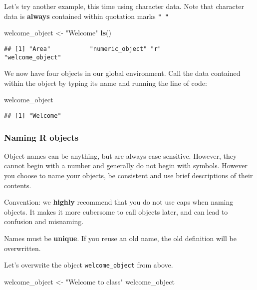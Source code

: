 \documentclass[]{article}
\newenvironment{Shaded}{\begin{snugshade}}{\end{snugshade}}
\newcommand{\KeywordTok}[1]{\textcolor[rgb]{0.13,0.29,0.53}{\textbf{#1}}}
\newcommand{\StringTok}[1]{\textcolor[rgb]{0.31,0.60,0.02}{#1}}
\newcommand{\NormalTok}[1]{#1}
\begin{document}
Let's try another example, this time using character data. Note that
character data is \textbf{always} contained within quotation marks
\texttt{"\ "}

\begin{Shaded}
\begin{Highlighting}[]
\NormalTok{welcome_object <-}\StringTok{ "Welcome"}
\KeywordTok{ls}\NormalTok{()}
\end{Highlighting}
\end{Shaded}

\begin{verbatim}
## [1] "Area"           "numeric_object" "r"              "welcome_object"
\end{verbatim}

We now have four objects in our global environment. Call the data
contained within the object by typing its name and running the line of
code:

\begin{Shaded}
\begin{Highlighting}[]
\NormalTok{welcome_object}
\end{Highlighting}
\end{Shaded}

\begin{verbatim}
## [1] "Welcome"
\end{verbatim}

\subsubsection{Naming R objects}\label{naming-r-objects}

Object names can be anything, but are always case sensitive. However,
they cannot begin with a number and generally do not begin with symbols.
However you choose to name your objects, be consistent and use brief
descriptions of their contents.

Convention: we \textbf{highly} recommend that you do not use caps when
naming objects. It makes it more cubersome to call objects later, and
can lead to confusion and misnaming.

Names must be \textbf{\textbf{unique}}. If you reuse an old name, the
old definition will be overwritten.

Let's overwrite the object \texttt{welcome\_object} from above.

\begin{Shaded}
\begin{Highlighting}[]
\NormalTok{welcome_object <-}\StringTok{ "Welcome to class"} 
\NormalTok{welcome_object}
\end{Highlighting}
\end{Shaded}
\end{document}
